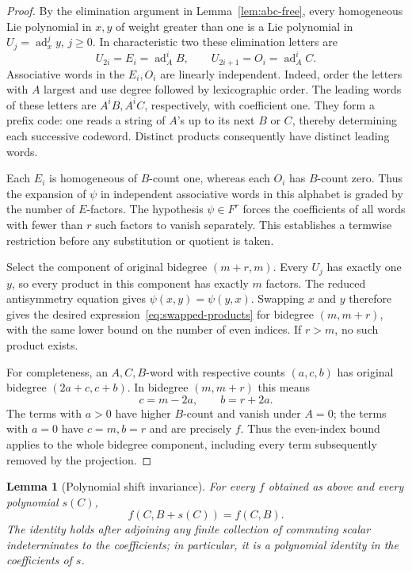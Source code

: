 \documentclass[11pt]{article}
\newtheorem{lemma}[theorem]{Lemma}
\theoremstyle{definition}
\theoremstyle{remark}
\numberwithin{equation}{section}
\begin{document}
\begin{proof}
By the elimination argument in Lemma~\ref{lem:abc-free}, every
homogeneous Lie polynomial in $x,y$ of weight greater than one is a
Lie polynomial in $U_j=\operatorname{ad}_x^j y$, $j\geq0$.
In characteristic two these elimination letters are
\[
 U_{2i}=E_i=\operatorname{ad}_A^i B,
 \qquad
 U_{2i+1}=O_i=\operatorname{ad}_A^i C.
\]
Associative words in the $E_i,O_i$ are linearly independent.
Indeed, order the letters with $A$ largest and use degree followed
by lexicographic order.  The leading words of these letters are
$A^iB,A^iC$, respectively, with coefficient one.
They form a prefix code: one reads a string of $A$'s up to its
next $B$ or $C$, thereby determining each successive codeword.
Distinct products consequently have distinct leading words.

Each $E_i$ is homogeneous of $B$-count one, whereas each $O_i$
has $B$-count zero.  Thus the expansion of $\psi$ in independent
associative words in this alphabet is graded by the number of
$E$-factors.  The hypothesis $\psi\in F^r$ forces the coefficients
of all words with fewer than $r$ such factors to vanish separately.
This establishes a termwise restriction before any substitution
or quotient is taken.

Select the component of original bidegree $(m+r,m)$.
Every $U_j$ has exactly one $y$, so every product in this component
has exactly $m$ factors.  The reduced antisymmetry equation gives
$\psi(x,y)=\psi(y,x)$.  Swapping $x$ and $y$ therefore gives
the desired expression~\eqref{eq:swapped-products} for bidegree
$(m,m+r)$, with the same lower bound on the number of even indices.
If $r>m$, no such product exists.

For completeness, an $A,C,B$-word with respective counts $(a,c,b)$
has original bidegree $(2a+c,c+b)$.  In bidegree $(m,m+r)$ this means
\begin{equation}
 \label{eq:bidegree-counts}
 c=m-2a,\qquad b=r+2a.
\end{equation}
The terms with $a>0$ have higher $B$-count and vanish under $A=0$;
the terms with $a=0$ have $c=m,b=r$ and are precisely $f$.
Thus the even-index bound applies to the whole bidegree component,
including every term subsequently removed by the projection.
\end{proof}

\begin{lemma}[Polynomial shift invariance]
\label{lem:shift-invariance}
For every $f$ obtained as above and every polynomial $s(C)$,
\begin{equation}
 \label{eq:polynomial-shift}
 f(C,B+s(C))=f(C,B).
\end{equation}
The identity holds after adjoining any finite collection of
commuting scalar indeterminates to the coefficients; in particular,
it is a polynomial identity in the coefficients of $s$.
\end{lemma}
\end{document}
